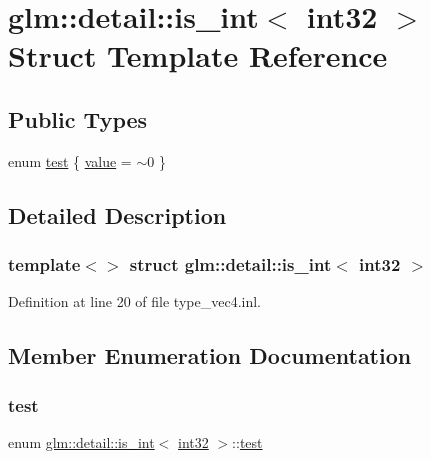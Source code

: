 \hypertarget{structglm_1_1detail_1_1is__int_3_01int32_01_4}{}\section{glm\+::detail\+::is\+\_\+int$<$ int32 $>$ Struct Template Reference}
\label{structglm_1_1detail_1_1is__int_3_01int32_01_4}
\subsection*{Public Types}
\begin{DoxyCompactItemize}
\item 
enum \mbox{\hyperlink{structglm_1_1detail_1_1is__int_3_01int32_01_4_ad400146c56b42f07c8c14c71c5f7322f}{test}} \{ \mbox{\hyperlink{structglm_1_1detail_1_1is__int_3_01int32_01_4_ad400146c56b42f07c8c14c71c5f7322fa24dfcabf3ede34dbfc990ec0c0ed4264}{value}} = $\sim$0
 \}
\end{DoxyCompactItemize}


\subsection{Detailed Description}
\subsubsection*{template$<$$>$\newline
struct glm\+::detail\+::is\+\_\+int$<$ int32 $>$}



Definition at line 20 of file type\+\_\+vec4.\+inl.



\subsection{Member Enumeration Documentation}
\mbox{\label{structglm_1_1detail_1_1is__int_3_01int32_01_4_ad400146c56b42f07c8c14c71c5f7322f}} 
\subsubsection{\texorpdfstring{test}{test}}
{\footnotesize\ttfamily enum \mbox{\hyperlink{structglm_1_1detail_1_1is__int}{glm\+::detail\+::is\+\_\+int}}$<$ \mbox{\hyperlink{namespaceglm_1_1detail_a9f85b4efeca416cdcec2fd08939a2e17}{int32}} $>$\+::\mbox{\hyperlink{structglm_1_1detail_1_1is__int_3_01int32_01_4_ad400146c56b42f07c8c14c71c5f7322f}{test}}}

